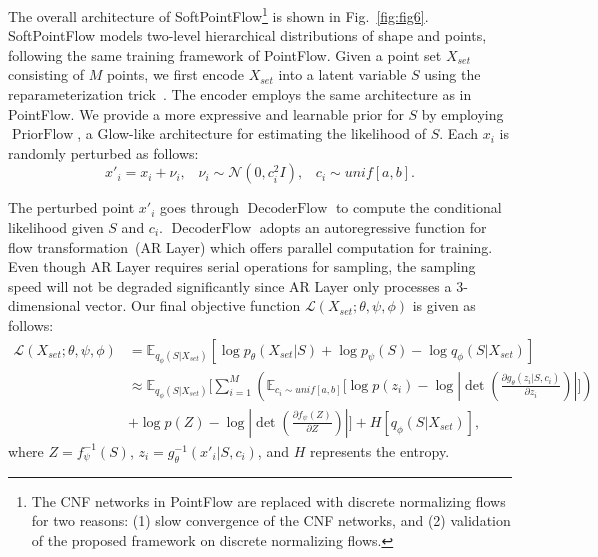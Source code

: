 \documentclass{article}
\DeclareMathOperator{\PriorFlow}{PriorFlow}
\DeclareMathOperator{\DecoderFlow}{DecoderFlow}
\begin{document}
The overall architecture of SoftPointFlow\footnote{The CNF networks in PointFlow are replaced with discrete normalizing flows for two reasons: (1) slow convergence of the CNF networks, and (2) validation of the proposed framework on discrete normalizing flows.} is shown in Fig.~\ref{fig:fig6}. SoftPointFlow models two-level hierarchical distributions of shape and points, following the same training framework of PointFlow. Given a point set $X_{set}$ consisting of $M$ points, we first encode $X_{set}$ into a latent variable ${S}$ using the reparameterization trick~\citep{kingma2013auto}. The encoder employs the same architecture as in PointFlow. We provide a more expressive and learnable prior for ${S}$ by employing $\PriorFlow$, a Glow-like architecture for estimating the likelihood of ${S}$. Each $x_{i}$ is randomly perturbed as follows:
 \begin{equation}
\label{eq:eq13}
x'_{i} = x_{i} + \nu_{i}, \;\;\; \nu_{i} \sim \mathcal{N}(0,c^{2}_{i}I), \;\;\; c_{i} \sim unif[a,b].
\end{equation}
 
 The perturbed point $x'_{i}$ goes through $\DecoderFlow$ to compute the conditional likelihood given ${S}$ and $c_{i}$. $\DecoderFlow$ adopts an autoregressive function for flow transformation~(AR Layer) which offers parallel computation for training. Even though AR Layer requires serial operations for sampling, the sampling speed will not be degraded significantly since AR Layer only processes a 3-dimensional vector. Our final objective function $\mathcal{L}(X_{set};\theta, \psi, \phi)$ is given as follows:
 \begin{equation}
\label{eq:eq14}
\begin{split}
\mathcal{L}(X_{set};\theta, \psi, \phi) &= \mathbb{E}_{q_{\phi}(S|X_{set})}[\log p_{\theta}(X_{set}|S) + \log p_{\psi}(S) - \log q_{\phi}(S|X_{set})] \\
           &\approx \mathbb{E}_{q_{\phi}(S|X_{set})}\Bigg[\sum_{i=1}^{M}\left(
           \mathbb{E}_{c_{i}\sim unif[a,b]}\bigg[
           \log p(z_{i}) - \log\left|\det\left(\frac{\partial {g_{\theta}}({z_{i}}|S, c_{i})}{\partial{z_{i}}}\right)\right|\bigg]\right) \\
           &+\log p({Z}) - \log\left|\det\left(\frac{\partial {f_{\psi}}({Z})}{\partial{Z}}\right)\right|\Bigg] + H[q_{\phi}(S|X_{set})],
\end{split}
\end{equation}
where $Z=f^{-1}_{\psi}(S)$, $z_{i}=g^{-1}_{\theta}(x'_{i}|S,c_{i})$, and $H$ represents the entropy. 
\end{document}
